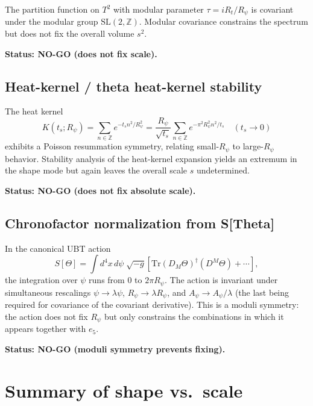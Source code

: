 \documentclass[11pt,a4paper]{article}
\begin{document}
The partition function on $T^2$ with modular parameter $\tau=iR_t/R_\psi$ is
covariant under the modular group $\mathrm{SL}(2,\mathbb{Z})$.  Modular
covariance constrains the spectrum but does not fix the overall volume $s^2$.

\textbf{Status: NO-GO (does not fix scale).}

\subsection{Heat-kernel / theta heat-kernel stability}

The heat kernel
\begin{equation}
  K(t_s;R_\psi)=\sum_{n\in\mathbb{Z}}e^{-t_s n^2/R_\psi^2}
  =\frac{R_\psi}{\sqrt{t_s}}\sum_{n\in\mathbb{Z}}e^{-\pi^2 R_\psi^2 n^2/t_s}
  \quad (t_s\to 0)
\end{equation}
exhibits a Poisson resummation symmetry, relating small-$R_\psi$ to large-$R_\psi$
behavior.  Stability analysis of the heat-kernel expansion yields an extremum in
the shape mode but again leaves the overall scale $s$ undetermined.

\textbf{Status: NO-GO (does not fix absolute scale).}

\subsection{Chronofactor normalization from S[Theta]}

In the canonical UBT action
\begin{equation}
  S[\Theta]=\int d^4x\,d\psi\;\sqrt{-g}\left[
    \mathrm{Tr}(D_M\Theta)^\dagger(D^M\Theta)+\cdots
  \right],
\end{equation}
the integration over $\psi$ runs from $0$ to $2\pi R_\psi$.  The action is
invariant under simultaneous rescalings $\psi\to\lambda\psi$,
$R_\psi\to\lambda R_\psi$, and $A_\psi\to A_\psi/\lambda$ (the last being
required for covariance of the covariant derivative).  This is a moduli
symmetry: the action does not fix $R_\psi$ but only constrains the
combinations in which it appears together with $e_5$.

\textbf{Status: NO-GO (moduli symmetry prevents fixing).}

\section{Summary of shape vs.\ scale}
\end{document}
